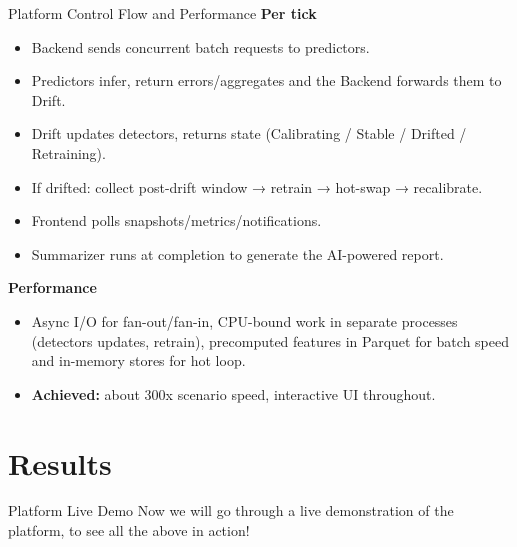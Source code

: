 \documentclass[aspectratio=169,11pt]{beamer}
\begin{document}
\begin{frame}{Platform Control Flow and Performance}
    \textbf{Per tick}
    \begin{itemize}
        \item Backend sends concurrent batch requests to predictors.
        \item Predictors infer, return errors/aggregates and the Backend forwards them to Drift.
        \item Drift updates detectors, returns state (Calibrating / Stable / Drifted / Retraining).
        \item If drifted: collect post-drift window → retrain → hot-swap → recalibrate.
        \item Frontend polls snapshots/metrics/notifications.
        \item Summarizer runs at completion to generate the AI-powered report.
    \end{itemize}

    \smallskip
    \textbf{Performance}
    \begin{itemize}
        \item Async I/O for fan-out/fan-in, CPU-bound work in separate processes (detectors updates, retrain), precomputed features in Parquet for batch speed and in-memory stores for hot loop.
        \item \textbf{Achieved:} about 300x scenario speed, interactive UI throughout.
    \end{itemize}
\end{frame}

\section{Results}

\begin{frame}{Platform Live Demo}
    \large Now we will go through a live demonstration of the platform, to see all the above in action!
\end{frame}
\end{document}
